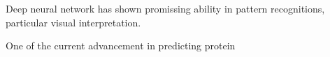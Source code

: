 Deep neural network has shown promissing ability in pattern recognitions, particular visual interpretation.
\par 

One of the current advancement in predicting protein 